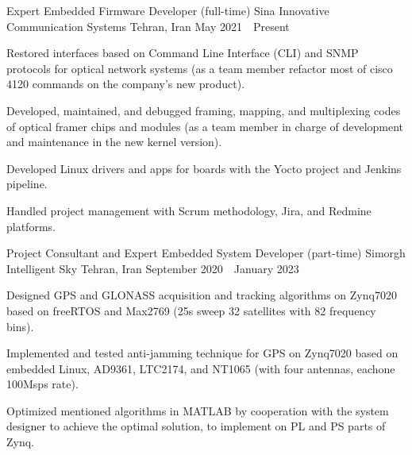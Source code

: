


\begin{cventries}

  \cventry
    {Expert Embedded Firmware Developer (full-time)} %
    {Sina Innovative Communication Systems} %
    {Tehran, Iran} %
    {May 2021~\textendash~Present} %
    {
      \begin{cvitems} %
        \item {Restored interfaces based on Command Line Interface (CLI) and SNMP protocols for optical network systems (as a team member refactor most of cisco 4120 commands on the company's new product).}
	\item {Developed, maintained, and debugged framing, mapping, and multiplexing codes of optical framer chips and modules (as a team member in charge of development and maintenance in the new kernel version).}
	\item {Developed Linux drivers and apps for boards with the Yocto project and Jenkins pipeline.}
	\item {Handled project management with Scrum methodology, Jira, and Redmine platforms.}
      \end{cvitems}
    }

  \cventry
    {Project Consultant and Expert Embedded System Developer (part-time)} %
    {Simorgh Intelligent Sky} %
    {Tehran, Iran} %
    {September 2020~\textendash~January 2023} %
    {
      \begin{cvitems} %
        \item {Designed GPS and GLONASS acquisition and tracking algorithms on Zynq7020 based on freeRTOS and Max2769 (25s sweep 32 satellites with 82 frequency bins).}
        \item {Implemented and tested anti-jamming technique for GPS on Zynq7020 based on embedded Linux, AD9361, LTC2174, and NT1065 (with four antennas, eachone 100Msps rate).}
	\item {Optimized mentioned algorithms in MATLAB by cooperation with the system designer to achieve the optimal solution, to implement on PL and PS parts of Zynq.}
      \end{cvitems}
    }


\end{cventries}
